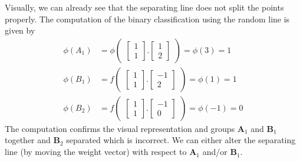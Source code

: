Visually, we can already see that the separating line does not split the points properly. The computation of the binary classification using the random line is given by
\begin{align*}
  \phi(A_1) &= \phi\begin{pmatrix}
    \begin{bmatrix}
      1\\
      1
    \end{bmatrix}.\begin{bmatrix}
      1 \\
      2
    \end{bmatrix}
  \end{pmatrix} = \phi(3) = 1 \\
  \phi(B_1) &= f\begin{pmatrix}
    \begin{bmatrix}
      1\\
      1
    \end{bmatrix}.\begin{bmatrix}
      -1 \\
      2
    \end{bmatrix}
  \end{pmatrix} = \phi(1) = 1 \\
  \phi(B_2) &= f\begin{pmatrix}
    \begin{bmatrix}
      1\\
      1
    \end{bmatrix}.\begin{bmatrix}
      -1 \\
      0
    \end{bmatrix}
  \end{pmatrix} = \phi(-1) = 0
\end{align*}
The computation confirms the visual representation and groups $\textbf{A}_1$ and $\textbf{B}_1$ together and $\textbf{B}_2$ separated which is incorrect. We can either alter the separating line (by moving the weight vector) with respect to $\textbf{A}_1$ and/or $\textbf{B}_1$.
